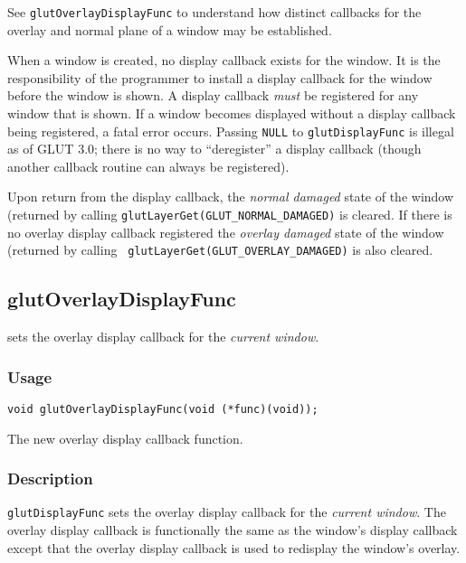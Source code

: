 See {\tt glutOverlayDisplayFunc} to understand how distinct callbacks
for the overlay and normal plane of a window may be established.

When a window is created, no display callback exists for
the window. 
It is the responsibility of the programmer to install
a display callback for the window before the window is shown.
A display callback {\em must} be registered for any window that is
shown.  If a window becomes displayed without a display
callback being registered, a fatal error occurs. 
Passing {\tt NULL} to {\tt glutDisplayFunc} is illegal as of GLUT 3.0;
there is no way to ``deregister'' a display callback (though another
callback routine can always be registered).

Upon return from the display callback, the {\em normal damaged} state of the
window (returned by calling {\tt glutLayerGet(GLUT\_NORMAL\_DAMAGED)}
is cleared.  If there is no overlay display callback registered the
{\em overlay damaged} state of the window (returned by calling {\tt
glutLayerGet(GLUT\_OVERLAY\_DAMAGED)} is also cleared.

\subsection{glutOverlayDisplayFunc}

 sets the overlay display callback
for the {\em current window}.

\subsubsection*{Usage}

\begin{verbatim}
void glutOverlayDisplayFunc(void (*func)(void));
\end{verbatim}
\begin{description}
\itemsep 0in
\item[{\tt func}]
The new overlay display callback function.
\end{description}

\subsubsection*{Description}

{\tt glutDisplayFunc} sets the overlay display callback for the {\em current
window}.  The overlay display callback is functionally the same as the window's display callback
except that the overlay display callback is used to redisplay the window's overlay.

